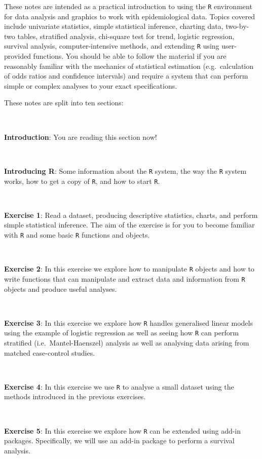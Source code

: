 \documentclass[12pt,a4paper]{book}
\theoremstyle{definition}
\theoremstyle{definition}
\theoremstyle{definition}
\theoremstyle{remark}
\begin{document}
These notes are intended as a practical introduction to using the
\texttt{R} environment for data analysis and graphics to work with
epidemiological data. Topics covered include univariate statistics,
simple statistical inference, charting data, two-by-two tables,
stratified analysis, chi-square test for trend, logistic regression,
survival analysis, computer-intensive methods, and extending \texttt{R}
using user-provided functions. You should be able to follow the material
if you are reasonably familiar with the mechanics of statistical
estimation (e.g.~calculation of odds ratios and confidence intervals)
and require a system that can perform simple or complex analyses to your
exact specifications.

These notes are split into ten sections:

~

\textbf{Introduction}: You are reading this section now!

~

\textbf{Introducing R}: Some information about the \texttt{R} system,
the way the \texttt{R} system works, how to get a copy of \texttt{R},
and how to start \texttt{R}.

~

\textbf{Exercise 1}: Read a dataset, producing descriptive statistics,
charts, and perform simple statistical inference. The aim of the
exercise is for you to become familiar with \texttt{R} and some basic
\texttt{R} functions and objects.

~

\textbf{Exercise 2}: In this exercise we explore how to manipulate
\texttt{R} objects and how to write functions that can manipulate and
extract data and information from \texttt{R} objects and produce useful
analyses.

~

\textbf{Exercise 3}: In this exercise we explore how \texttt{R} handles
generalised linear models using the example of logistic regression as
well as seeing how \texttt{R} can perform stratified
(i.e.~Mantel-Haenszel) analysis as well as analysing data arising from
matched case-control studies.

~

\textbf{Exercise 4}: In this exercise we use \texttt{R} to analyse a
small dataset using the methods introduced in the previous exercises.

~

\textbf{Exercise 5}: In this exercise we explore how \texttt{R} can be
extended using add-in packages. Specifically, we will use an add-in
package to perform a survival analysis.
\end{document}
